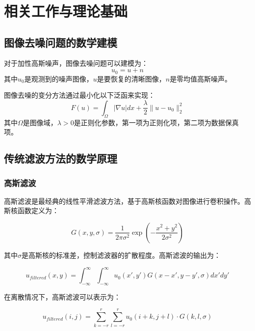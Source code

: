 \documentclass[a4paper,12pt]{ctexart}
\begin{document}
\section{相关工作与理论基础}

\subsection{图像去噪问题的数学建模}

对于加性高斯噪声，图像去噪问题可以建模为：
\begin{equation}
u_0 = u + n
\end{equation}
其中$u_0$是观测到的噪声图像，$u$是要恢复的清晰图像，$n$是零均值高斯噪声。

图像去噪的变分方法通过最小化以下泛函来实现：
\begin{equation}
F(u) = \int_{\Omega} |\nabla u| dx + \frac{\lambda}{2} \|u - u_0\|_2^2
\end{equation}
其中$\Omega$是图像域，$\lambda > 0$是正则化参数，第一项为正则化项，第二项为数据保真项。

\subsection{传统滤波方法的数学原理}

\subsubsection{高斯滤波}

高斯滤波是最经典的线性平滑滤波方法，基于高斯核函数对图像进行卷积操作。高斯核函数定义为：

\begin{equation}
G(x,y,\sigma) = \frac{1}{2\pi\sigma^2} \exp\left(-\frac{x^2+y^2}{2\sigma^2}\right)
\end{equation}

其中$\sigma$是高斯核的标准差，控制滤波器的扩散程度。高斯滤波的输出为：

\begin{equation}
u_{filtered}(x,y) = \int_{-\infty}^{\infty} \int_{-\infty}^{\infty} u_0(x',y') G(x-x',y-y',\sigma) dx' dy'
\end{equation}

在离散情况下，高斯滤波可以表示为：

\begin{equation}
u_{filtered}(i,j) = \sum_{k=-r}^{r} \sum_{l=-r}^{r} u_0(i+k,j+l) \cdot G(k,l,\sigma)
\end{equation}
\end{document}
